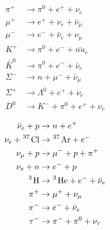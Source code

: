 \documentclass{homework}
\begin{document}
\begin{enumerate}
		\begin{minipage}{0.5\textwidth}
			\begin{align*}
				\pi^+ & \to \pi^0 + e^+ + \nu_e \\
				\mu^+ & \to e^+ + \nu_e + \bar{\nu}_\mu \\
				\mu^- & \to e^- + \bar{\nu}_e + \nu_\mu \\
				K^+ & \to \pi^0 + e^- + \bar{nu}_e \\
				\bar{K}^0 & \to \pi^0 + e^- + \bar{\nu}_e \\
				\Sigma^- & \to n + \mu^- + \bar{\nu}_\mu \\
				\Sigma^+ & \to \Lambda^0 + e^+ + \nu_e \\
				D^0 & \to K^- + \pi^0 + e^+ + \nu_e
			\end{align*}
		\end{minipage}
		\begin{minipage}{0.5\textwidth}
			\begin{align*}
				\bar{\nu}_e + p & \to n + e^+ \\
				\nu_e + \ce{^37 Cl} & \to \ce{^37 Ar} + e^- \\
				\nu_\mu + p & \to \mu^- + p + \pi^+ \\
				\nu_e + n & \to e^- + p \\
				\ce{^3 H} & \to \ce{^3 He} + e^- + \bar{\nu}_e \\
				\pi^+ & \to \mu^+ + \nu_\mu \\
				\pi^- & \to e^- + \bar{\nu}_e \\
				\tau^- & \to \pi^- + \pi^0 + \nu_\tau
			\end{align*}
		\end{minipage}
		
		\pagebreak
		

\end{enumerate}
\end{document}

